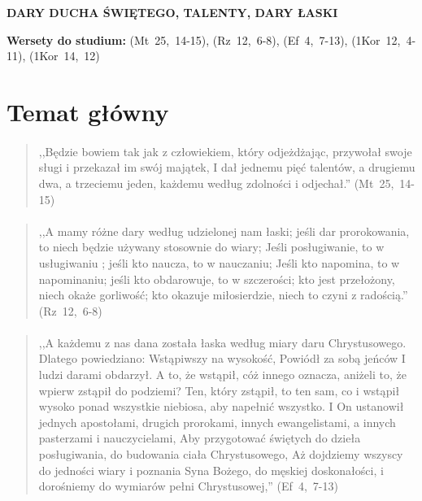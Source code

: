 \documentclass[10pt,a4paper,oneside]{article}
\begin{document}
\centerline{\textbf{\MakeUppercase{Dary Ducha Świętego, talenty, dary łaski}}}
\begin{center}
\textbf{Wersety do studium:} 
\mbox{(Mt 25, 14-15)}, \mbox{(Rz 12, 6-8)}, \mbox{(Ef 4, 7-13)}, \mbox{(1Kor 12, 4-11)}, \mbox{(1Kor 14, 12)}
\end{center}
\section{Temat główny}
\paragraph{}
\begin{quote}
,,Będzie bowiem tak jak z człowiekiem, który odjeżdżając, przywołał swoje sługi i przekazał im swój majątek, I dał jednemu pięć talentów, a drugiemu dwa, a trzeciemu jeden, każdemu według zdolności i odjechał.'' \mbox{(Mt 25, 14-15)}
\end{quote}
\paragraph{}
\begin{quote}
,,A mamy różne dary według udzielonej nam łaski; jeśli dar prorokowania, to niech będzie używany stosownie do wiary; Jeśli posługiwanie, to w usługiwaniu ; jeśli kto naucza, to w nauczaniu; Jeśli kto napomina, to w napominaniu; jeśli kto obdarowuje, to w szczerości; kto jest przełożony, niech okaże gorliwość; kto okazuje miłosierdzie, niech to czyni z radością.'' \mbox{(Rz 12, 6-8)}
\end{quote}
\paragraph{}
\begin{quote}
,,A każdemu z nas dana została łaska według miary daru Chrystusowego. Dlatego powiedziano: Wstąpiwszy na wysokość, Powiódł za sobą jeńców I ludzi darami obdarzył. A to, że wstąpił, cóż innego oznacza, aniżeli to, że wpierw zstąpił do podziemi? Ten, który zstąpił, to ten sam, co i wstąpił wysoko ponad wszystkie niebiosa, aby napełnić wszystko. I On ustanowił jednych apostołami, drugich prorokami, innych ewangelistami, a innych pasterzami i nauczycielami, Aby przygotować świętych do dzieła posługiwania, do budowania ciała Chrystusowego, Aż dojdziemy wszyscy do jedności wiary i poznania Syna Bożego, do męskiej doskonałości, i dorośniemy do wymiarów pełni Chrystusowej,'' \mbox{(Ef 4, 7-13)}
\end{quote}
\end{document}
